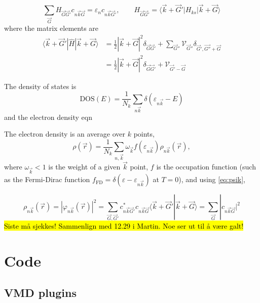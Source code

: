 \documentclass[11pt,bibliography=totoc,index=totoc]{scrbook}   %
\newcommand{\comment}[1]{\hl{#1}}
\begin{document}
\begin{equation}
    \sum_{\vec{G}} H_{\vec{G}\vec{G}'} c_{n\vec{k}\vec{G}}  = \varepsilon_n c_{n\vec{k}\vec{G}'}, \qquad H_{\vec{G}\vec{G}'} = \langle \vec{k}+\vec{G}'|H_{ks}|\vec{k}+\vec{G}\rangle
\end{equation}
where the matrix elements are
\begin{align}
    \langle\vec{k}+\vec{G}'|\hat{H}|\vec{k}+\vec{G}\rangle &= \frac12|\vec{k}+\vec{G}|^2\delta_{\vec{G}\vec{G}'} + \sum_{\vec{G}''} \mathcal{V}_{\vec{G}''} \delta_{\vec{G}',\vec{G''}+\vec{G}}\\
    &= \frac12|\vec{k}+\vec{G}|^2\delta_{\vec{G}\vec{G}'} + \mathcal{V}_{\vec{G}'-\vec{G}}
\end{align}

The density of states is
\begin{equation}
    \text{DOS}(E) = \frac{1}{N_k}\sum_{n\vec{k}}\delta(\varepsilon_{n\vec{k}}-E) 
\end{equation}
and the electron density
eqn

The electron density is an average over $k$ points,
\begin{equation}
    \rho(\vec{r}) = \frac{1}{N_k}\sum_{n,\vec{k}} \omega_{\vec{k}} f(\varepsilon_{n\vec{k}}) \rho_{n\vec{k}}(\vec{r}),
\end{equation}
where $\omega_{\vec{k}}<1$ is the weight of a given $\vec{k}$ point,
$f$ is the occupation function (such as the Fermi-Dirac function $f_{\text{FD}} = \delta(\varepsilon-\varepsilon_{n\vec{k}})$ at $T=0$), and using \eqref{eq:psik},

\begin{equation}
    \rho_{n\vec{k}}(\vec{r}) = |\varphi_{n\vec{k}}(\vec{r})|^2 = \sum_{\vec{G},\vec{G}'} c_{n\vec{k}\vec{G}'}^* c_{n\vec{k}\vec{G}} \langle \vec{k}+\vec{G}' | \vec{k}+\vec{G} \rangle = \sum_{\vec{G}} |c_{n\vec{k}\vec{G}}|^2 
\end{equation}
\comment{Siste m{\aa} sjekkes! Sammenlign med 12.29 i Martin. Noe ser ut til {\aa} v\ae re galt!}



\chapter{Code}

\section{VMD plugins}
\end{document}

